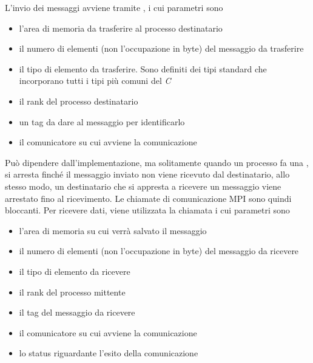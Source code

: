\documentclass[10pt, letterpaper]{report}
\begin{document}
L'invio dei messaggi avviene tramite , i cui parametri sono\begin{itemize}
    \item {} l'area di memoria da trasferire al processo destinatario 
    \item {} il numero di elementi (non l'occupazione in byte) del messaggio da trasferire 
    \item {} il tipo di elemento da trasferire. Sono definiti dei tipi standard che 
    incorporano tutti i tipi più comuni del \textit{C}
    \item {} il rank del processo destinatario
    \item {} un tag da dare al messaggio per identificarlo 
    \item {} il comunicatore  su cui avviene la comunicazione
\end{itemize}
Può dipendere dall'implementazione, ma solitamente quando un processo fa una , si arresta finché 
il messaggio inviato non viene ricevuto dal destinatario, allo stesso modo, un destinatario che si appresta a ricevere 
un messaggio viene arrestato fino al ricevimento. Le chiamate di comunicazione MPI sono quindi bloccanti. \acc 
Per ricevere dati, viene utilizzata la chiamata   i cui parametri sono\begin{itemize}
    \item {} l'area di memoria su cui verrà salvato il messaggio 
    \item {} il numero di elementi (non l'occupazione in byte) del messaggio da ricevere 
    \item  {} il tipo di elemento da ricevere
    \item {} il rank del processo mittente
    \item {} il tag del messaggio da ricevere
    \item {} il comunicatore su cui avviene la comunicazione
    \item {} lo status riguardante l'esito della comunicazione
\end{itemize}
\end{document}
